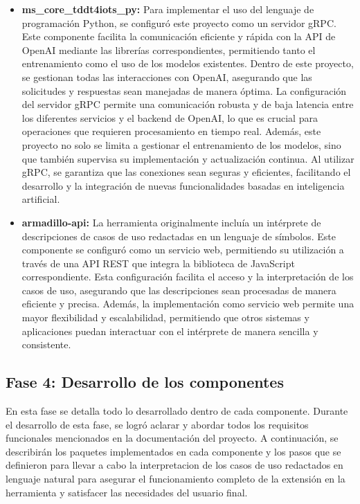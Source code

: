 \begin{itemize}
	\item \textbf{ms\_core\_tddt4iots\_py: } Para implementar el uso del lenguaje de programación Python, se configuró este proyecto como un servidor gRPC. Este componente facilita la comunicación eficiente y rápida con la API de OpenAI mediante las librerías correspondientes, permitiendo tanto el entrenamiento como el uso de los modelos existentes. Dentro de este proyecto, se gestionan todas las interacciones con OpenAI, asegurando que las solicitudes y respuestas sean manejadas de manera óptima. La configuración del servidor gRPC permite una comunicación robusta y de baja latencia entre los diferentes servicios y el backend de OpenAI, lo que es crucial para operaciones que requieren procesamiento en tiempo real. Además, este proyecto no solo se limita a gestionar el entrenamiento de los modelos, sino que también supervisa su implementación y actualización continua. Al utilizar gRPC, se garantiza que las conexiones sean seguras y eficientes, facilitando el desarrollo y la integración de nuevas funcionalidades basadas en inteligencia artificial.
	
	\item \textbf{armadillo-api: } La herramienta originalmente incluía un intérprete de descripciones de casos de uso redactadas en un lenguaje de símbolos. Este componente se configuró como un servicio web, permitiendo su utilización a través de una API REST que integra la biblioteca de JavaScript correspondiente. Esta configuración facilita el acceso y la interpretación de los casos de uso, asegurando que las descripciones sean procesadas de manera eficiente y precisa. Además, la implementación como servicio web permite una mayor flexibilidad y escalabilidad, permitiendo que otros sistemas y aplicaciones puedan interactuar con el intérprete de manera sencilla y consistente.

\end{itemize}

\subsection{Fase 4: Desarrollo de los componentes}

En esta fase se detalla todo lo desarrollado dentro de cada componente. Durante el desarrollo de esta fase, se logró aclarar y abordar todos los requisitos funcionales mencionados en la documentación del proyecto. A continuación, se describirán los paquetes implementados en cada componente y los pasos que se definieron para llevar a cabo la interpretacion de los casos de uso redactados en lenguaje natural para asegurar el funcionamiento completo de la extensión en la herramienta y satisfacer las necesidades del usuario final.

